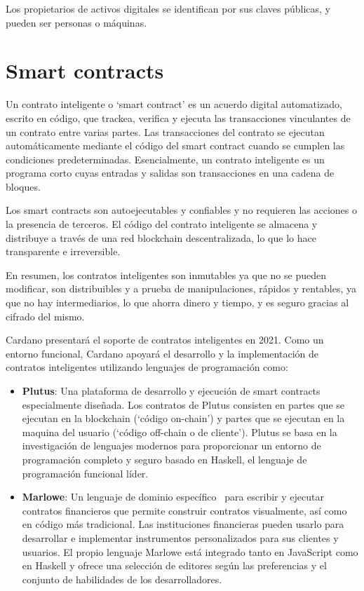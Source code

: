 \documentclass[12pt]{book}
\begin{document}
Los propietarios de activos digitales se identifican por sus claves públicas, y pueden ser personas o máquinas.

\section{Smart contracts}

Un contrato inteligente o `smart contract' es un acuerdo digital automatizado, escrito en código, que trackea, verifica y ejecuta las transacciones vinculantes de un contrato entre varias partes. Las transacciones del contrato se ejecutan automáticamente mediante el código del smart contract cuando se cumplen las condiciones predeterminadas. Esencialmente, un contrato inteligente es un programa corto cuyas entradas y salidas son transacciones en una cadena de bloques.

Los smart contracts son autoejecutables y confiables y no requieren las acciones o la presencia de terceros. El código del contrato inteligente se almacena y distribuye a través de una red blockchain descentralizada, lo que lo hace transparente e irreversible.

En resumen, los contratos inteligentes son inmutables ya que no se pueden modificar, son distribuibles y a prueba de manipulaciones, rápidos y rentables, ya que no hay intermediarios, lo que ahorra dinero y tiempo, y es seguro gracias al cifrado del mismo.

Cardano presentará el soporte de contratos inteligentes en 2021. Como un entorno funcional, Cardano apoyará el desarrollo y la implementación de contratos inteligentes utilizando lenguajes de programación como:

\begin{itemize}
    \item \textbf{Plutus}: Una plataforma de desarrollo y ejecución de smart contracts especialmente diseñada. 
    Los contratos de Plutus consisten en partes que se ejecutan en la blockchain (`código on-chain') y partes que se ejecutan en la maquina del usuario (`código off-chain o de cliente').
    Plutus se basa en la investigación de lenguajes modernos para proporcionar un entorno de programación completo y seguro basado en Haskell, el lenguaje de programación funcional líder.
    
    \item \textbf{Marlowe}: Un lenguaje de dominio específico~\cite{fowler2010dsl} para escribir y ejecutar contratos financieros que permite construir contratos visualmente, así como en código más tradicional. Las instituciones financieras pueden usarlo para desarrollar e implementar instrumentos personalizados para sus clientes y usuarios. El propio lenguaje Marlowe está integrado tanto en JavaScript como en Haskell y ofrece una selección de editores según las preferencias y el conjunto de habilidades de los desarrolladores.
\end{itemize}
\end{document}
